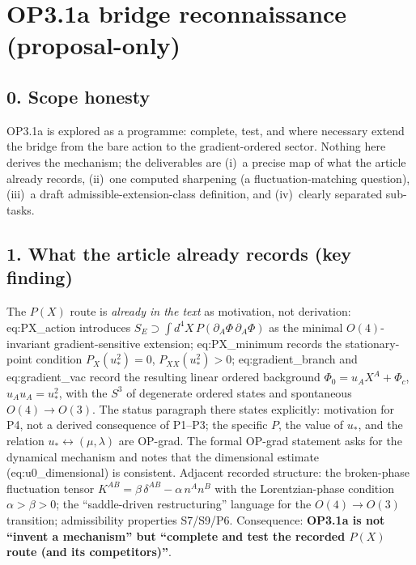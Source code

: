 \section*{OP3.1a bridge reconnaissance (proposal-only)}

\subsection*{0. Scope honesty}
OP3.1a is explored as a programme: complete, test, and where
necessary extend the bridge from the bare action to the
gradient-ordered sector.
Nothing here derives the mechanism; the deliverables are
(i)~a precise map of what the article already records,
(ii)~one computed sharpening (a fluctuation-matching question),
(iii)~a draft admissible-extension-class definition, and
(iv)~clearly separated sub-tasks.

\subsection*{1. What the article already records (key finding)}
The $P(X)$ route is \emph{already in the text} as motivation, not
derivation: eq:PX\_action introduces
$S_E\supset\int d^4X\,P(\partial_A\Phi\,\partial_A\Phi)$ as the
minimal $O(4)$-invariant gradient-sensitive extension;
eq:PX\_minimum records the stationary-point condition
$P_X(u_*^2)=0$, $P_{XX}(u_*^2)>0$; eq:gradient\_branch and
eq:gradient\_vac record the resulting linear ordered background
$\Phi_0=u_AX^A+\Phi_c$, $u_Au_A=u_*^2$, with the $S^3$ of
degenerate ordered states and spontaneous $O(4)\to O(3)$.
The status paragraph there states explicitly: motivation for P4,
not a derived consequence of P1--P3; the specific $P$, the value
of $u_*$, and the relation $u_*\leftrightarrow(\mu,\lambda)$ are
OP-grad.
The formal OP-grad statement asks for the dynamical mechanism and
notes that the dimensional estimate (eq:u0\_dimensional) is
consistent.
Adjacent recorded structure: the broken-phase fluctuation tensor
$K^{AB}=\beta\,\delta^{AB}-\alpha\,n^An^B$ with the
Lorentzian-phase condition $\alpha>\beta>0$; the
``saddle-driven restructuring'' language for the $O(4)\to O(3)$
transition; admissibility properties S7/S9/P6.
Consequence: \textbf{OP3.1a is not ``invent a mechanism'' but
``complete and test the recorded $P(X)$ route (and its
competitors)''}.


